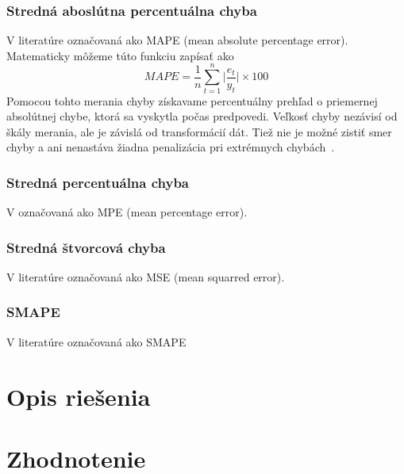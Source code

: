 \documentclass[a4paper,slovak,12pt,appendix]{article}
\begin{document}
\subsubsection{Stredná aboslútna percentuálna chyba}
V literatúre označovaná ako MAPE (mean absolute percentage error). Matematicky
môžeme túto funkciu zapísať ako
\begin{equation}
  MAPE = \frac{1}{n} \sum_{t=1}^{n} \Big|\frac{e_t}{y_t}\Big| \times 100
  \label{eq-mape}
\end{equation}
Pomocou tohto merania chyby získavame percentuálny prehľad o priemernej
absolútnej chybe, ktorá sa vyskytla počas predpovedi. Veľkosť chyby nezávisí od
škály merania, ale je závislá od transformácií dát. Tiež nie je možné zistiť
smer chyby a ani nenastáva žiadna penalizácia pri extrémnych
chybách~\cite{Agrawal2013}.

\subsubsection{Stredná percentuálna chyba}
V označovaná ako MPE (mean percentage error).

\subsubsection{Stredná štvorcová chyba}
V literatúre označovaná ako MSE (mean squarred error).

\subsubsection{SMAPE}
V literatúre označovaná ako SMAPE



\newpage
\section{Opis riešenia}


\newpage
\section{Zhodnotenie}
\end{document}
